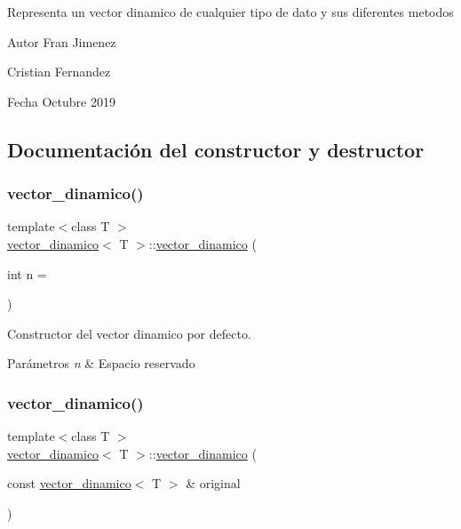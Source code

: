 Representa un vector dinamico de cualquier tipo de dato y sus diferentes metodos

\begin{DoxyAuthor}{Autor}
Fran Jimenez 

Cristian Fernandez 
\end{DoxyAuthor}
\begin{DoxyDate}{Fecha}
Octubre 2019 
\end{DoxyDate}


\subsection{Documentación del constructor y destructor}
\mbox{\label{classvector__dinamico_ad32cc31634a714ac416d8f711fde4c4b}} 
\subsubsection{\texorpdfstring{vector\+\_\+dinamico()}{vector\_dinamico()}\hspace{0.1cm}{\footnotesize\ttfamily [1/2]}}
{\footnotesize\ttfamily template$<$class T $>$ \\
\hyperlink{classvector__dinamico}{vector\+\_\+dinamico}$<$ T $>$\+::\hyperlink{classvector__dinamico}{vector\+\_\+dinamico} (\begin{DoxyParamCaption}\item[{int}]{n = {} }\end{DoxyParamCaption})}



Constructor del vector dinamico por defecto. 


\begin{DoxyParams}{Parámetros}
{\em n} & Espacio reservado \\
\hline
\end{DoxyParams}
\mbox{\label{classvector__dinamico_a9408bb09596374eabcbebe495f9dd2c6}} 
\subsubsection{\texorpdfstring{vector\+\_\+dinamico()}{vector\_dinamico()}\hspace{0.1cm}{\footnotesize\ttfamily [2/2]}}
{\footnotesize\ttfamily template$<$class T $>$ \\
\hyperlink{classvector__dinamico}{vector\+\_\+dinamico}$<$ T $>$\+::\hyperlink{classvector__dinamico}{vector\+\_\+dinamico} (\begin{DoxyParamCaption}\item[{const \hyperlink{classvector__dinamico}{vector\+\_\+dinamico}$<$ T $>$ \&}]{original }\end{DoxyParamCaption})}



